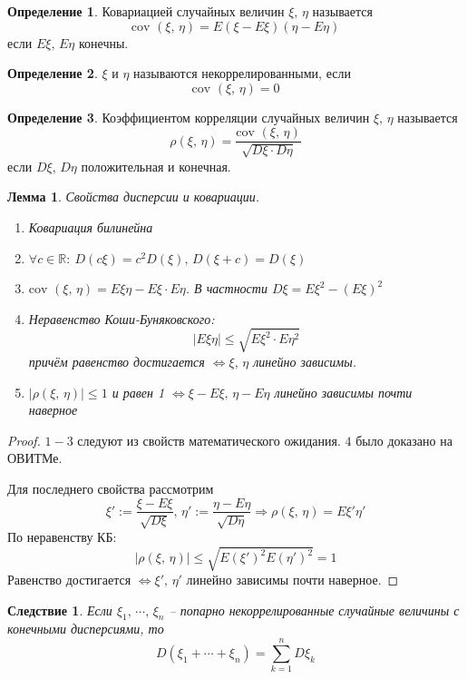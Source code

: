 \documentclass[a4paper,12pt]{article}
\renewcommand{\leq}{\ensuremath{\leqslant}}
\theoremstyle{plain}
\newtheorem{lemma}{Лемма}[section]
\newtheorem*{corollary}{Следствие}
\theoremstyle{definition}
\newtheorem{definition}{Определение}[section]
\theoremstyle{remark}
\begin{document}
\begin{definition}
	Ковариацией случайных величин $\xi,\,\eta$ называется
	\[\text{cov }(\xi,\,\eta) = E(\xi - E\xi)(\eta - E\eta)\]
	если $E\xi,\, E\eta$ конечны.
\end{definition}

\begin{definition}
	$\xi$ и $\eta$ называются некоррелированными, если
	\[\text{cov }(\xi,\,\eta) = 0\]
\end{definition}

\begin{definition}
	Коэффициентом корреляции случайных величин $\xi,\, \eta$ называется
	\[\rho(\xi,\,\eta) = \frac{\text{cov }(\xi,\,\eta)}{\sqrt{D\xi\cdot D\eta}}\]
	если $D\xi,\, D\eta$ положительная и конечная.
\end{definition}

\begin{lemma}
	Свойства дисперсии и ковариации.

	\begin{enumerate}
		\item Ковариация билинейна
		\item $\forall c \in \mathbb{R}:\: D(c\xi) = c^2D(\xi),\, D(\xi + c) = D(\xi)$
		\item $\text{cov }(\xi,\,\eta) = E\xi\eta - E\xi\cdot E\eta$. В частности $D\xi = E\xi^2 - (E\xi)^2$
		\item Неравенство Коши-Буняковского:
		      \[|E\xi\eta| \leq \sqrt{E\xi^2 \cdot E\eta^2}\]
		      причём равенство достигается $\Leftrightarrow \xi,\, \eta$ линейно зависимы.
		\item $|\rho(\xi,\,\eta)| \leq 1$ и равен 1 $\Leftrightarrow \xi - E\xi,\, \eta - E\eta$ линейно зависимы почти наверное
	\end{enumerate}
\end{lemma}

\begin{proof}
	$1-3$ следуют из свойств математического ожидания. $4$ было доказано на ОВИТМе.

	Для последнего свойства рассмотрим
	\[\xi' := \frac{\xi - E\xi}{\sqrt{D\xi}},\, \eta' := \frac{\eta - E\eta}{\sqrt{D\eta}} \Rightarrow \rho(\xi,\, \eta) = E\xi'\eta'\]
	По неравенству КБ:
	\[|\rho(\xi,\,\eta)| \leq \sqrt{E(\xi')^2E(\eta')^2} = 1\]
	Равенство достигается $\Leftrightarrow \xi',\, \eta'$ линейно зависимы почти наверное.
\end{proof}

\begin{corollary}
	Если $\xi_1,\,\cdots,\,\xi_n$ -- попарно некоррелированные случайные величины с конечными дисперсиями, то
	\[D(\xi_1 + \cdots + \xi_n) = \sum_{k = 1}^n D\xi_k\]
\end{corollary}
\end{document}
